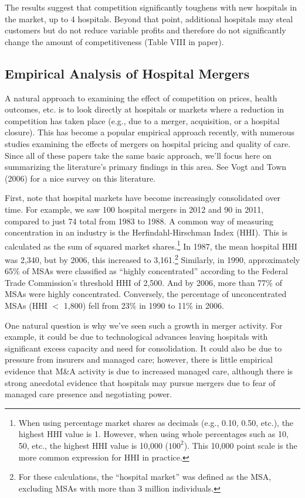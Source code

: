 \documentclass[
  letterpaper,
  DIV=11,
  numbers=noendperiod]{scrreport}
\theoremstyle{definition}
\theoremstyle{remark}
\begin{document}
The results suggest that competition significantly toughens with new
hospitals in the market, up to 4 hospitals. Beyond that point,
additional hospitals may steal customers but do not reduce variable
profits and therefore do not significantly change the amount of
competitiveness (Table VIII in paper).

\hypertarget{empirical-analysis-of-hospital-mergers}{%
\subsection{Empirical Analysis of Hospital
Mergers}\label{empirical-analysis-of-hospital-mergers}}

A natural approach to examining the effect of competition on prices,
health outcomes, etc. is to look directly at hospitals or markets where
a reduction in competition has taken place (e.g., due to a merger,
acquisition, or a hospital closure). This has become a popular empirical
approach recently, with numerous studies examining the effects of
mergers on hospital pricing and quality of care. Since all of these
papers take the same basic approach, we'll focus here on summarizing the
literature's primary findings in this area. See Vogt and Town (2006) for
a nice survey on this literature.

First, note that hospital markets have become increasingly consolidated
over time. For example, we saw 100 hospital mergers in 2012 and 90 in
2011, compared to just 74 total from 1983 to 1988. A common way of
measuring concentration in an industry is the Herfindahl-Hirschman Index
(HHI). This is calculated as the sum of squared market
shares.\footnote{When using percentage market shares as decimals (e.g., 0.10, 0.50, etc.), the highest HHI value is 1. However, when using whole percentages such as 10, 50, etc., the highest HHI value is 10,000 ($100^{2}$). This 10,000 point scale is the more common expression for HHI in practice.}
In 1987, the mean hospital HHI was 2,340, but by 2006, this increased to
3,161.\footnote{For these calculations, the ``hospital market'' was
  defined as the MSA, excluding MSAs with more than 3 million
  individuals.} Similarly, in 1990, approximately 65\% of MSAs were
classified as ``highly concentrated'' according to the Federal Trade
Commission's threshold HHI of 2,500. And by 2006, more than 77\% of MSAs
were highly concentrated. Conversely, the percentage of unconcentrated
MSAs (HHI \(<\) 1,800) fell from 23\% in 1990 to 11\% in 2006.

One natural question is why we've seen such a growth in merger activity.
For example, it could be due to technological advances leaving hospitals
with significant excess capacity and need for consolidation. It could
also be due to pressure from insurers and managed care; however, there
is little empirical evidence that M\&A activity is due to increased
managed care, although there is strong anecdotal evidence that hospitals
may pursue mergers due to fear of managed care presence and negotiating
power.
\end{document}

